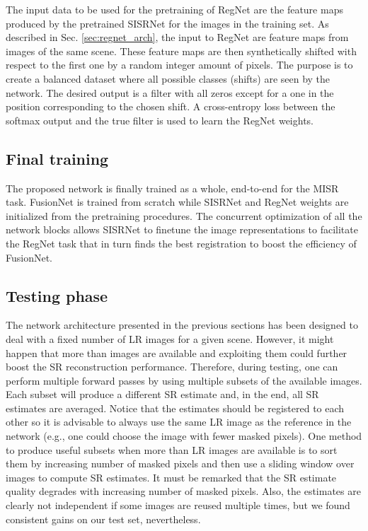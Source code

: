 \documentclass[journal]{IEEEtran}
\begin{document}
The input data to be used for the pretraining of RegNet are the feature maps produced by the pretrained SISRNet for the images in the training set. As described in Sec. \ref{sec:regnet_arch}, the input to RegNet are  feature maps from images of the same scene. These feature maps are then synthetically shifted with respect to the first one by a random integer amount of pixels. The purpose is to create a balanced dataset where all possible  classes (shifts) are seen by the network. The desired output is a filter with all zeros except for a one in the position corresponding to the chosen shift. A cross-entropy loss between the softmax output and the true filter is used to learn the RegNet weights.

\subsection{Final training}
The proposed network is finally trained as a whole, end-to-end for the MISR task. FusionNet is trained from scratch while SISRNet and RegNet weights are initialized from the pretraining procedures.
The concurrent optimization of all the network blocks allows SISRNet to finetune the image representations to facilitate the RegNet task that in turn finds the best registration to boost the efficiency of FusionNet. 

\subsection{Testing phase} \label{sec:testing}
The network architecture presented in the previous sections has been designed to deal with a fixed number  of LR images for a given scene. However, it might happen that more than  images are available and exploiting them could further boost the SR reconstruction performance. Therefore, during testing, one can perform multiple forward passes by using multiple subsets of the available images. Each subset will produce a different SR estimate and, in the end, all SR estimates are averaged. Notice that the estimates should be registered to each other so it is advisable to always use the same LR image as the reference in the network (e.g., one could choose the image with fewer masked pixels). One method to produce useful subsets when more than  LR images are available is to sort them by increasing number of masked pixels and then use a sliding window over  images to compute SR estimates. It must be remarked that the SR estimate quality degrades with increasing number of masked pixels. Also, the estimates are clearly not independent if some images are reused multiple times, but we found consistent gains on our test set, nevertheless.
\end{document}
